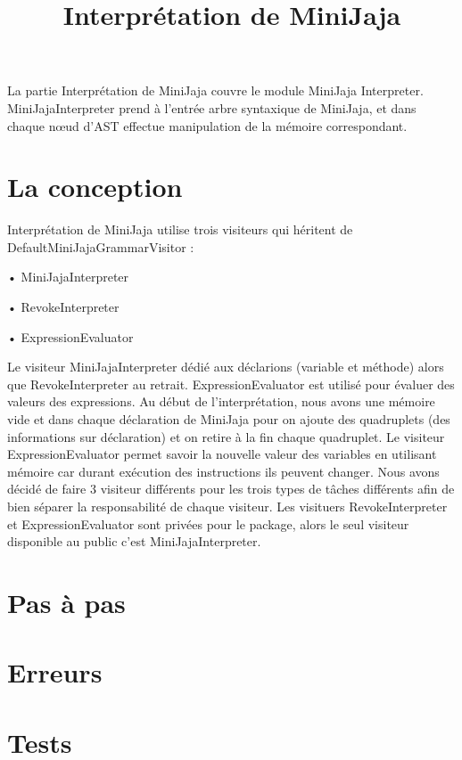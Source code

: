 \documentclass[a4paper,12pt]{article}
\title{Interprétation de MiniJaja}
\begin{document}
\maketitle
La partie Interprétation de MiniJaja couvre le module MiniJaja Interpreter.  MiniJajaInterpreter prend à l’entrée arbre syntaxique de MiniJaja, et dans chaque nœud d’AST effectue manipulation de la mémoire correspondant. 
\section{La conception}
Interprétation de MiniJaja utilise trois visiteurs qui héritent de DefaultMiniJajaGrammarVisitor : 

•	MiniJajaInterpreter

•	RevokeInterpreter

•	ExpressionEvaluator

Le visiteur MiniJajaInterpreter dédié aux déclarions (variable et méthode) alors que RevokeInterpreter au retrait. ExpressionEvaluator est utilisé pour évaluer des valeurs des expressions. 
Au début de l’interprétation, nous avons une mémoire vide et dans chaque déclaration de MiniJaja pour on  ajoute des quadruplets (des informations sur déclaration) et on retire à la fin chaque quadruplet. Le visiteur ExpressionEvaluator permet savoir la nouvelle valeur des variables en utilisant mémoire car durant exécution des instructions ils peuvent changer. 
Nous avons décidé de faire  3 visiteur différents pour les trois types de tâches différents afin de bien séparer la responsabilité de chaque visiteur. Les visituers RevokeInterpreter et ExpressionEvaluator sont privées pour le package, alors le seul visiteur disponible au public c’est MiniJajaInterpreter. 

\section{Pas à pas}   
\section{Erreurs}
\section{Tests}
\end{document}
